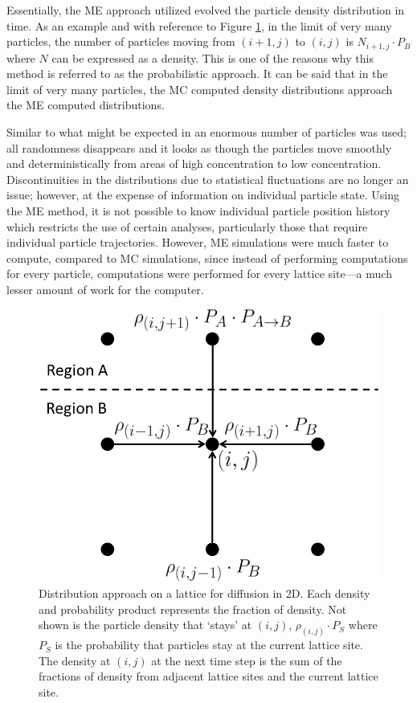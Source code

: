 	Essentially, the ME approach utilized evolved the particle density distribution in time. As an example and with reference to Figure \ref{fig:fd-distribution}, in the limit of very many particles, the number of particles moving from $ (i+1,j) $ to $ (i,j) $ is $ N_{i+1,j} \cdot P_B $ where $ N $ can be expressed as a density. This is one of the reasons why this method is referred to as the probabilistic approach. It can be said that in the limit of very many particles, the MC computed density distributions approach the ME computed distributions.

	Similar to what might be expected in an enormous number of particles was used; all randomness disappears and it looks as though the particles move smoothly and deterministically from areas of high concentration to low concentration. Discontinuities in the distributions due to statistical fluctuations are no longer an issue; however, at the expense of information on individual particle state. Using the ME method, it is not possible to know individual particle position history which restricts the use of certain analyses, particularly those that require individual particle trajectories. However, ME simulations were much faster to compute, compared to MC simulations, since instead of performing computations for every particle, computations were performed for every lattice site---a much lesser amount of work for the computer.
	
	\begin{figure}[h]
		\centering
		\includegraphics[width=0.6\linewidth]{../images/fd-distribution}
		\caption[Master equation: the density distribution approach]{Distribution approach on a lattice for diffusion in 2D. Each density and probability product represents the fraction of density. Not shown is the particle density that `stays' at $ (i,j) $, $ \rho_{(i,j)} \cdot P_S $ where $ P_S $ is the probability that particles stay at the current lattice site. The density at $ (i,j) $ at the next time step is the sum of the fractions of density from adjacent lattice sites and the current lattice site.}
		\label{fig:fd-distribution}
	\end{figure}

